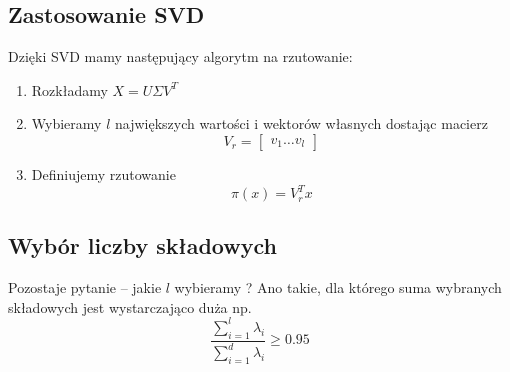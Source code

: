 \subsection{Zastosowanie SVD}
Dzięki SVD mamy następujący algorytm na rzutowanie:
\begin{enumerate}
	\item Rozkładamy \( X = U\Sigma V^T \)
	\item Wybieramy \( l \) największych wartości i wektorów własnych dostając macierz
	      \[
		      V_r = \begin{bmatrix}
			      v_1 \dots v_l
		      \end{bmatrix}
	      \]
	\item Definiujemy rzutowanie
	      \[
		      \pi(x) = V_r^T x
	      \]
\end{enumerate}

\subsection{Wybór liczby składowych}

Pozostaje pytanie -- jakie \( l \) wybieramy ?
Ano takie, dla którego suma wybranych składowych jest wystarczająco duża np.
\[
	\frac{\sum_{i=1}^l \lambda_i}{\sum_{i=1}^d \lambda_i} \geq 0.95
\]